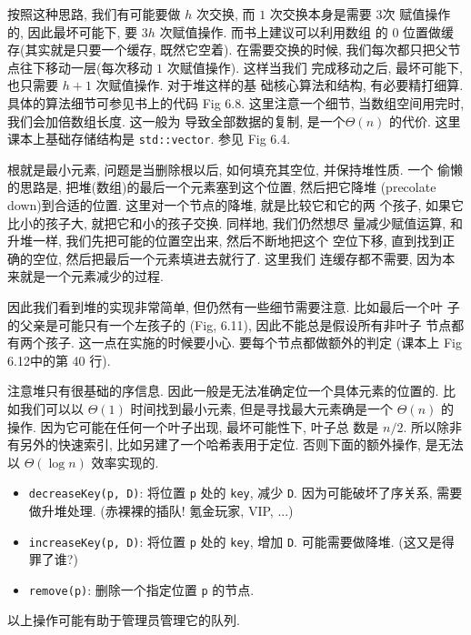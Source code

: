 \documentclass[a4paper]{ctexart}
\theoremstyle{definition}
\theoremstyle{definition}
\begin{document}
按照这种思路, 我们有可能要做 $h$ 次交换, 而 $1$ 次交换本身是需要 $3$次
赋值操作的, 因此最坏可能下, 要 $3h$ 次赋值操作. 而书上建议可以利用数组
的 $0$ 位置做缓存(其实就是只要一个缓存, 既然它空着). 在需要交换的时候,
我们每次都只把父节点往下移动一层(每次移动 $1$ 次赋值操作). 这样当我们
完成移动之后, 最坏可能下, 也只需要 $h + 1$ 次赋值操作. 对于堆这样的基
础核心算法和结构, 有必要精打细算. 具体的算法细节可参见书上的代码 Fig
6.8. 这里注意一个细节, 当数组空间用完时, 我们会加倍数组长度. 这一般为
导致全部数据的复制, 是一个$\Theta(n)$ 的代价. 这里课本上基础存储结构是
\verb|std::vector|. 参见 Fig 6.4.


根就是最小元素, 问题是当删除根以后, 如何填充其空位, 并保持堆性质. 一个
偷懒的思路是, 把堆(数组)的最后一个元素塞到这个位置, 然后把它降堆
(precolate down)到合适的位置. 这里对一个节点的降堆, 就是比较它和它的两
个孩子, 如果它比小的孩子大, 就把它和小的孩子交换. 同样地, 我们仍然想尽
量减少赋值运算, 和升堆一样, 我们先把可能的位置空出来, 然后不断地把这个
空位下移, 直到找到正确的空位, 然后把最后一个元素填进去就行了. 这里我们
连缓存都不需要, 因为本来就是一个元素减少的过程.

因此我们看到堆的实现非常简单, 但仍然有一些细节需要注意. 比如最后一个叶
子的父亲是可能只有一个左孩子的 (Fig, 6.11), 因此不能总是假设所有非叶子
节点都有两个孩子. 这一点在实施的时候要小心. 要每个节点都做额外的判定
(课本上 Fig 6.12中的第 40 行). 


注意堆只有很基础的序信息. 因此一般是无法准确定位一个具体元素的位置的.
比如我们可以以 $\Theta(1)$ 时间找到最小元素, 但是寻找最大元素确是一个
$\Theta(n)$ 的操作. 因为它可能在任何一个叶子出现, 最坏可能性下, 叶子总
数是 $n / 2$. 所以除非有另外的快速索引, 比如另建了一个哈希表用于定位.
否则下面的额外操作, 是无法以 $\Theta(\log n)$ 效率实现的.

\begin{itemize}
\item \verb|decreaseKey(p, D)|: 将位置 \verb|p| 处的 \verb|key|, 减少
  \verb|D|. 因为可能破坏了序关系, 需要做升堆处理. (赤裸裸的插队! 氪金玩家, VIP, ...)

\item \verb|increaseKey(p, D)|: 将位置 \verb|p| 处的 \verb|key|, 增加
  \verb|D|. 可能需要做降堆. (这又是得罪了谁?)

\item \verb|remove(p)|: 删除一个指定位置 \verb|p| 的节点.
\end{itemize}
以上操作可能有助于管理员管理它的队列.
\end{document}
